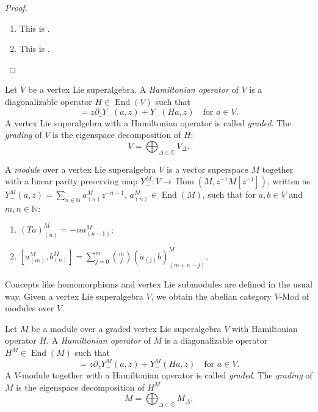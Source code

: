 \documentclass[a4paper, 12pt, reqno]{amsart}
\theoremstyle{remark}
\numberwithin{equation}{subsection}
\DeclareMathOperator{\End}{End}
\DeclareMathOperator{\Hom}{Hom}
\begin{document}
\begin{proof}\leavevmode
  \begin{enumerate}
  \item This is .
  \item This is . \qedhere
  \end{enumerate}
\end{proof}

Let $V$ be a vertex Lie superalgebra.
A \emph{Hamiltonian operator} of $V$ is a diagonalizable operator $H \in \End(V)$ such that
\begin{equation*}
  [H, Y_-(a, z)] = z\partial_zY_-(a, z) + Y_-(Ha, z) \quad \text{for }a \in V.
\end{equation*}
A vertex Lie superalgebra with a Hamiltonian operator is called \emph{graded}.
The \emph{grading} of $V$ is the eigenspace decomposition of $H$:
\begin{equation*}
  V = \bigoplus_{\Delta \in \mathbb{C}}V_{\Delta}.
\end{equation*}

A \emph{module} over a vertex Lie superalgebra $V$ is a vector superspace $M$ together with a linear parity preserving map $Y^M_-: V \to \Hom(M, z^{-1}M[z^{-1}])$, written as $Y^M_-(a, z) = \sum_{n \in \mathbb{N}}a^M_{(n)}z^{-n - 1}$, $a^M_{(n)} \in \End(M)$, such that for $a, b \in V$ and $m, n \in \mathbb{N}$:
\begin{enumerate}
\item $(Ta)^M_{(n)} = -na^M_{(n - 1)}$;
\item $[a^M_{(m)}, b^M_{(n)}] = \sum_{j = 0}^m\binom{m}{j}(a_{(j)}b)^M_{(m + n - j)}$.
\end{enumerate}
Concepts like homomorphisms and vertex Lie submodules are defined in the usual way.
Given a vertex Lie superalgebra $V$, we obtain the abelian category $V$-Mod of modules over $V$.

Let $M$ be a module over a graded vertex Lie superalgebra $V$ with Hamiltonian operator $H$.
A \emph{Hamiltonian operator} of $M$ is a diagonalizable operator $H^M \in \End(M)$ such that
\begin{equation*}
  [H^M, Y^M_-(a, z)] = z\partial_zY^M_-(a, z) + Y^M_-(Ha, z) \quad \text{for }a \in V.
\end{equation*}
A $V$-module together with a Hamiltonian operator is called \emph{graded}.
The \emph{grading} of $M$ is the eigenspace decomposition of $H^M$
\begin{equation*}
  M = \bigoplus_{\Delta \in \mathbb{C}}M_{\Delta}.
\end{equation*}
\end{document}
